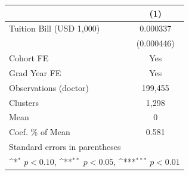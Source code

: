 {
\def\sym#1{\ifmmode^{#1}\else\(^{#1}\)\fi}
\begin{tabular}{l*{1}{c}}
\hline\hline
                    &\multicolumn{1}{c}{(1)}         \\
\hline
Tuition Bill (USD 1,000)&    0.000337         \\
                    &  (0.000446)         \\
[1em]
Cohort FE           &         Yes         \\
[1em]
Grad Year FE        &         Yes         \\
\hline
Observations (doctor)&     199,455         \\
Clusters            &       1,298         \\
Mean                &           0         \\
Coef. \% of Mean    &       0.581         \\
\hline\hline
\multicolumn{2}{l}{\footnotesize Standard errors in parentheses}\\
\multicolumn{2}{l}{\footnotesize \sym{*} \(p<0.10\), \sym{**} \(p<0.05\), \sym{***} \(p<0.01\)}\\
\end{tabular}
}
